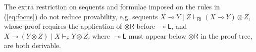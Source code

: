 \documentclass[submission,copyright,creativecommons]{eptcs}
\theoremstyle{definition}
\newcommand{\tr}{\otimes \mathsf{R}}
\newcommand{\lright}{{\multimap}\mathsf{R}}
\newcommand{\lleft}{{\multimap}\mathsf{L}}
\newcommand{\pass}{\mathsf{pass}}
\newcommand{\ax}{\mathsf{ax}}
\newcommand{\ot}{\otimes}
\newcommand{\lolli}{\multimap}
\newcommand{\RI}{\mathsf{RI}}
\newcommand{\LI}{\mathsf{LI}}
\newcommand{\Pass}{\mathsf{P}}
\newcommand{\F}{\mathsf{F}}
\begin{document}


 The extra restriction on sequents and formulae imposed on the rules in (\ref{eq:focus}) do not reduce provability, e.g. sequents $X \lolli Y \mid Z \vdash_{\RI} (X \lolli Y) \ot Z$, whose proof requires the application of $\tr$ before $\lleft$, and $X \lolli (Y \ot Z) \mid X \vdash_\F Y \ot Z$, where $\lleft$ must appear below $\tr$ in the proof tree, are both derivable.
\end{document}
